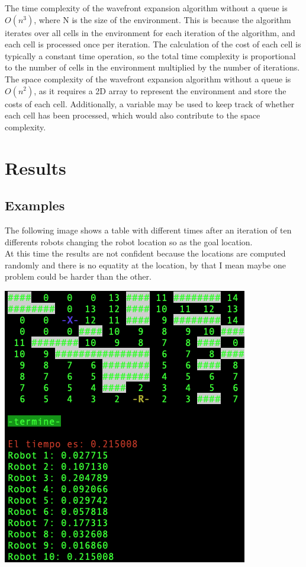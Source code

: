 \documentclass[oneside,twocolumn]{article}
\begin{document}
The time complexity of the wavefront expansion algorithm without a queue is $O(n^3)$, where N is the size of the environment. This is because the algorithm iterates over all cells in the environment for each iteration of the algorithm, and each cell is processed once per iteration. The calculation of the cost of each cell is typically a constant time operation, so the total time complexity is proportional to the number of cells in the environment multiplied by the number of iterations.\\

The space complexity of the wavefront expansion algorithm without a queue is $O(n^2)$, as it requires a 2D array to represent the environment and store the costs of each cell. Additionally, a variable may be used to keep track of whether each cell has been processed, which would also contribute to the space complexity.\\

\newpage
\twocolumn
\section{Results}

\subsection{Examples}
The following image shows a table with different times after an iteration of ten differents robots changing the robot location so as the goal location.\\

At this time the results are not confident because the locations are computed randomly and there is no equatity at the location, by that I mean maybe one problem could be harder than the other.

\includegraphics[scale=0.5]{image1.png}
\end{document}
